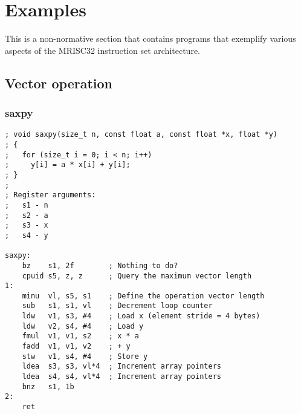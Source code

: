 %

\onecolumn

\chapter{Examples}

This is a non-normative section that contains programs that exemplify various
aspects of the MRISC32 instruction set architecture.

\section{Vector operation}

\subsection{saxpy}

\begin{lstlisting}[style=assembler]
; void saxpy(size_t n, const float a, const float *x, float *y)
; {
;   for (size_t i = 0; i < n; i++)
;     y[i] = a * x[i] + y[i];
; }
;
; Register arguments:
;   s1 - n
;   s2 - a
;   s3 - x
;   s4 - y

saxpy:
    bz    s1, 2f        ; Nothing to do?
    cpuid s5, z, z      ; Query the maximum vector length
1:
    minu  vl, s5, s1    ; Define the operation vector length
    sub   s1, s1, vl    ; Decrement loop counter
    ldw   v1, s3, #4    ; Load x (element stride = 4 bytes)
    ldw   v2, s4, #4    ; Load y
    fmul  v1, v1, s2    ; x * a
    fadd  v1, v1, v2    ; + y
    stw   v1, s4, #4    ; Store y
    ldea  s3, s3, vl*4  ; Increment array pointers
    ldea  s4, s4, vl*4  ; Increment array pointers
    bnz   s1, 1b
2:
    ret
\end{lstlisting}

\twocolumn
